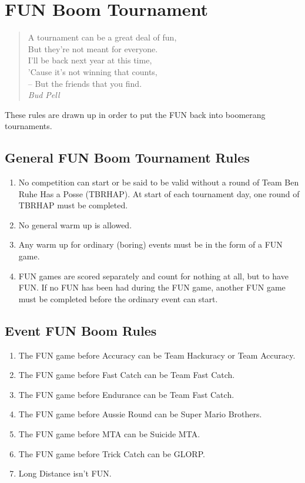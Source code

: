 
\chapter{FUN Boom Tournament}
\begin{quote}
A tournament can be a great deal of fun,\\
  But they’re not meant for everyone.\\
I’ll be back next year at this time,\\
  ’Cause it’s not winning that counts,\\[5 pt]
-- But the friends that you find.\\
\footnotesize \textit{Bud Pell}
\end{quote}
 \newpage
 
These rules are drawn up in order to put the FUN back into boomerang tournaments.

\section{General FUN Boom Tournament Rules}
\begin{enumerate}
\item No competition can start or be said to be valid without a round of Team Ben Ruhe Has a Posse (TBRHAP). At start of each tournament day, one round of TBRHAP must be completed.
\item No general warm up is allowed.
\item Any warm up for ordinary (boring) events must be in the form of a FUN game.
\item FUN games are scored separately and count for nothing at all, but to have FUN. If no FUN has been had during the FUN game, another FUN game must be completed before the ordinary event can start.
\end{enumerate} 
 
\section{Event FUN Boom Rules}
\begin{enumerate}
\item The FUN game before Accuracy can be Team Hackuracy or Team Accuracy.
\item The FUN game before Fast Catch can be Team Fast Catch.
\item The FUN game before Endurance can be Team Fast Catch.
\item The FUN game before Aussie Round can be Super Mario Brothers.
\item The FUN game before MTA can be Suicide MTA.
\item The FUN game before Trick Catch can be GLORP.
\item Long Distance isn’t FUN.
\end{enumerate} 
 
